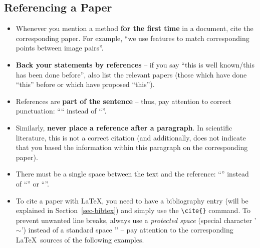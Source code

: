 \documentclass[11pt,a4paper]{article}
\begin{document}
\subsection{Referencing a Paper}
\begin{itemize}
\item Whenever you mention a method \textbf{for the first time} in a document, cite the corresponding paper. For example, ``we use  features to match corresponding points between image pairs''.

\item \textbf{Back your statements by references} -- if you say ``this is well known/this has been done before'', also list the relevant papers (those which have done ``this'' before or which have proposed ``this'').

\item References are \textbf{part of the sentence} -- thus, pay attention to correct punctuation: ```` instead of ``''.
 
\item Similarly, \textbf{never place a reference after a paragraph}. In scientific literature, this is not a correct citation (and additionally, does not indicate that you based the information within this paragraph on the corresponding paper).
 
\item There must be a single space between the text and the reference: ``'' instead of ``'' or ``''.
 
\item To cite a paper with \LaTeX, you need to have a bibliography entry (will be explained in Section~\ref{sec-bibtex}) and simply use the \texttt{\textbackslash{cite}\{\}} command. To prevent unwanted line breaks, always use a \emph{protected space} (special character '\texttt{$\sim$}')  instead of a standard space '\textvisiblespace' -- pay attention to the corresponding \LaTeX~sources of the following examples.
\end{itemize}
% 
\begin{goodexample}
  \begin{NoHyper}
    
  
  \end{NoHyper}
\end{goodexample}
\end{document}
